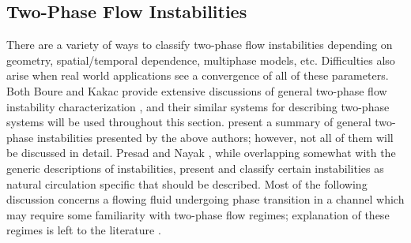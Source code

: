 \subsection{Two-Phase Flow Instabilities}
There are a variety of ways to classify two-phase flow instabilities depending on geometry, spatial/temporal dependence, multiphase models, etc.
Difficulties also arise when real world applications see a convergence of all of these parameters.
Both Boure \etal{} and Kakac \etal{} provide extensive discussions of general two-phase flow instability characterization \cite{boure_review_1973-1,kakac_review_2008-1}, and their similar systems for describing two-phase systems will be used throughout this section.
 present a summary of general two-phase instabilities presented by the above authors; however, not all of them will be discussed in detail.
Presad \etal \cite{durga_prasad_review_2007-1} and Nayak \etal \cite{nayak_flow_2008-1}, while overlapping somewhat with the generic descriptions of instabilities, present and classify certain instabilities as natural circulation specific that should be described.
Most of the following discussion concerns a flowing fluid undergoing phase transition in a channel which may require some familiarity with two-phase flow regimes; explanation of these regimes is left to the literature \cite{thome_chapter_2004-1,tong_boiling_1997-1,ghiaasiaan_two-phase_2007-1}.


